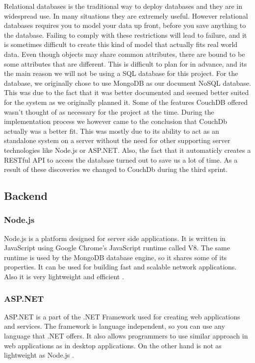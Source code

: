 Relational databases is the traditional way to deploy databases and they are in widespread use. In many situations they are extremely useful. However relational databases requires you to model your data up front, before you save anything to the database. Failing to comply with these restrictions will lead to failure, and it is sometimes difficult to create this kind of model that actually fits real world data. Even though objects may share common attributes, there are bound to be some attributes that are different. This is difficult to plan for in advance, and its the main reason we will not be using a SQL database for this project. For the database, we originally chose to use MongoDB as our document NoSQL database. This was due to the fact that it was better documented and seemed better suited for the system as we originally planned it. Some of the features CouchDB offered wasn't thought of as necessary for the project at the time. During the implementation process we however came to the conclusion that CouchDb actually was a better fit. This was mostly due to its ability to act as an standalone system on a server without the need for other supporting server technologies like Node.js or ASP.NET. Also, the fact that it automaticly creates a RESTful API to access the database turned out to save us a lot of time. As a result of these discoveries we changed to CouchDb during the third sprint.


\subsection{Backend}
\subsubsection*{Node.js}
Node.js is a platform designed for server side applications. It is written in JavaScript using Google Chrome's JavaScript runtime called V8. The same runtime is used by the MongoDB database engine, so it shares some of its properties. It can be used for building fast and scalable network applications. Also it is very lightweight and efficient \cite{nodejs-about}.

\subsubsection*{ASP.NET}
ASP.NET is a part of the .NET Framework used for creating web applications and
services. The framework is language independent, so you can use any language
that .NET offers. It also allows programmers to use similar approach in web
applications as in desktop applications. On the other hand is not as lightweight as Node.js \cite{aspnet-about, palermo2010asp.net}.

